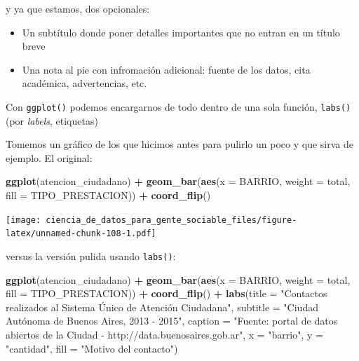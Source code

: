 \documentclass[]{book}
\newenvironment{Shaded}{\begin{snugshade}}{\end{snugshade}}
\newcommand{\KeywordTok}[1]{\textcolor[rgb]{0.13,0.29,0.53}{\textbf{#1}}}
\newcommand{\DataTypeTok}[1]{\textcolor[rgb]{0.13,0.29,0.53}{#1}}
\newcommand{\StringTok}[1]{\textcolor[rgb]{0.31,0.60,0.02}{#1}}
\newcommand{\OperatorTok}[1]{\textcolor[rgb]{0.81,0.36,0.00}{\textbf{#1}}}
\newcommand{\NormalTok}[1]{#1}
\providecommand{\tightlist}{%
  \setlength{\itemsep}{0pt}\setlength{\parskip}{0pt}}
\begin{document}
y ya que estamos, dos opcionales:

\begin{itemize}
\tightlist
\item
  Un subtítulo donde poner detalles importantes que no entran en un
  título breve
\item
  Una nota al pie con infromación adicional: fuente de los datos, cita
  académica, advertencias, etc.
\end{itemize}

Con \texttt{ggplot()} podemos encargarnos de todo dentro de una sola
función, \texttt{labs()} (por \emph{labels}, etiquetas)

Tomemos un gráfico de los que hicimos antes para pulirlo un poco y que
sirva de ejemplo. El original:

\begin{Shaded}
\begin{Highlighting}[]
\KeywordTok{ggplot}\NormalTok{(atencion_ciudadano) }\OperatorTok{+}
\StringTok{    }\KeywordTok{geom_bar}\NormalTok{(}\KeywordTok{aes}\NormalTok{(}\DataTypeTok{x =}\NormalTok{ BARRIO, }\DataTypeTok{weight =}\NormalTok{ total, }\DataTypeTok{fill =}\NormalTok{ TIPO_PRESTACION)) }\OperatorTok{+}
\StringTok{    }\KeywordTok{coord_flip}\NormalTok{()}
\end{Highlighting}
\end{Shaded}

\texttt{[image: ciencia\_de\_datos\_para\_gente\_sociable\_files/figure-latex/unnamed-chunk-108-1.pdf]}

versus la versión pulida usando \texttt{labs()}:

\begin{Shaded}
\begin{Highlighting}[]
\KeywordTok{ggplot}\NormalTok{(atencion_ciudadano) }\OperatorTok{+}
\StringTok{    }\KeywordTok{geom_bar}\NormalTok{(}\KeywordTok{aes}\NormalTok{(}\DataTypeTok{x =}\NormalTok{ BARRIO, }\DataTypeTok{weight =}\NormalTok{ total, }\DataTypeTok{fill =}\NormalTok{ TIPO_PRESTACION)) }\OperatorTok{+}
\StringTok{    }\KeywordTok{coord_flip}\NormalTok{() }\OperatorTok{+}
\StringTok{    }\KeywordTok{labs}\NormalTok{(}\DataTypeTok{title =} \StringTok{"Contactos realizados al Sistema Único de Atención Ciudadana"}\NormalTok{,}
         \DataTypeTok{subtitle =} \StringTok{"Ciudad Autónoma de Buenos Aires, 2013 - 2015"}\NormalTok{,}
         \DataTypeTok{caption =} \StringTok{"Fuente: portal de datos abiertos de la Ciudad - http://data.buenosaires.gob.ar"}\NormalTok{,}
         \DataTypeTok{x =} \StringTok{"barrio"}\NormalTok{,}
         \DataTypeTok{y =} \StringTok{"cantidad"}\NormalTok{,}
         \DataTypeTok{fill =} \StringTok{"Motivo del contacto"}\NormalTok{)}
\end{Highlighting}
\end{Shaded}
\end{document}
